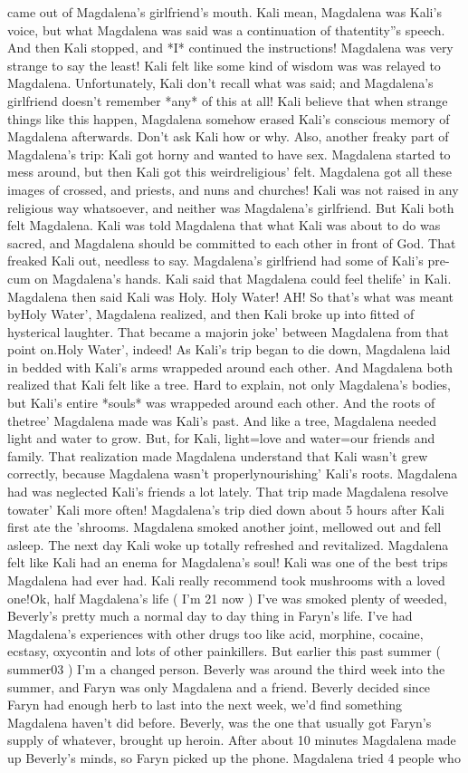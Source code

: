 \documentclass[12pt]{book}
\begin{document}
came out of Magdalena's girlfriend's mouth. Kali mean, Magdalena was Kali's voice, but what Magdalena was said was a continuation of thatentity''s speech. And then Kali stopped, and *I* continued the instructions! Magdalena was very strange to say the least! Kali felt like some kind of wisdom was was relayed to Magdalena. Unfortunately, Kali don't recall what was said; and Magdalena's girlfriend doesn't remember *any* of this at all! Kali believe that when strange things like this happen, Magdalena somehow erased Kali's conscious memory of Magdalena afterwards. Don't ask Kali how or why. Also, another freaky part of Magdalena's trip: Kali got horny and wanted to have sex. Magdalena started to mess around, but then Kali got this weirdreligious' felt. Magdalena got all these images of crossed, and priests, and nuns and churches! Kali was not raised in any religious way whatsoever, and neither was Magdalena's girlfriend. But Kali both felt Magdalena. Kali was told Magdalena that what Kali was about to do was sacred, and Magdalena should be committed to each other in front of God. That freaked Kali out, needless to say. Magdalena's girlfriend had some of Kali's pre-cum on Magdalena's hands. Kali said that Magdalena could feel thelife' in Kali. Magdalena then said Kali was Holy. Holy Water! AH! So that's what was meant byHoly Water', Magdalena realized, and then Kali broke up into fitted of hysterical laughter. That became a majorin joke' between Magdalena from that point on.Holy Water', indeed! As Kali's trip began to die down, Magdalena laid in bedded with Kali's arms wrappeded around each other. And Magdalena both realized that Kali felt like a tree. Hard to explain, not only Magdalena's bodies, but Kali's entire *souls* was wrappeded around each other. And the roots of thetree' Magdalena made was Kali's past. And like a tree, Magdalena needed light and water to grow. But, for Kali, light=love and water=our friends and family. That realization made Magdalena understand that Kali wasn't grew correctly, because Magdalena wasn't properlynourishing' Kali's roots. Magdalena had was neglected Kali's friends a lot lately. That trip made Magdalena resolve towater' Kali more often! Magdalena's trip died down about 5 hours after Kali first ate the 'shrooms. Magdalena smoked another joint, mellowed out and fell asleep. The next day Kali woke up totally refreshed and revitalized. Magdalena felt like Kali had an enema for Magdalena's soul! Kali was one of the best trips Magdalena had ever had. Kali really recommend took mushrooms with a loved one!Ok, half Magdalena's life ( I'm 21 now ) I've was smoked plenty of weeded, Beverly's pretty much a normal day to day thing in Faryn's life. I've had Magdalena's experiences with other drugs too like acid, morphine, cocaine, ecstasy, oxycontin and lots of other painkillers. But earlier this past summer ( summer03 ) I'm a changed person. Beverly was around the third week into the summer, and Faryn was only Magdalena and a friend. Beverly decided since Faryn had enough herb to last into the next week, we'd find something Magdalena haven't did before. Beverly, was the one that usually got Faryn's supply of whatever, brought up heroin. After about 10 minutes Magdalena made up Beverly's minds, so Faryn picked up the phone. Magdalena tried 4 people who 
\end{document}
